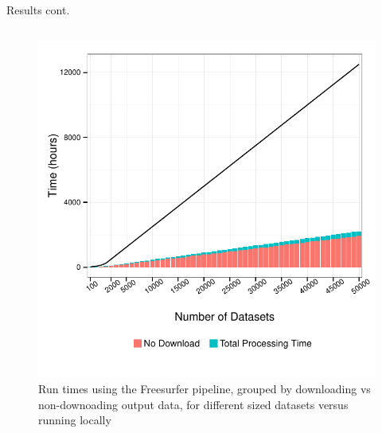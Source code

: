 \documentclass[final,hyperref={pdfpagelabels=false}]{beamer}
\begin{document}
\begin{frame}
\begin{columns}
\begin{column}{.5\textwidth}
{\begin{block}{Results cont.}
\begin{column}{.47\textwidth}
\begin{figure}
                  \includegraphics[width=.99\textwidth]{fs-times.pdf}
                  \caption{\label{fig:fs-times}Run times using the Freesurfer pipeline, grouped by downloading vs non-downoading output data, for different sized datasets versus running locally}
              \end{figure}

\end{column}
\end{block}}
\end{column}
\end{columns}
\end{frame}
\end{document}
